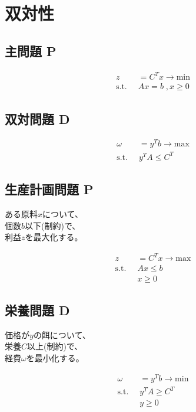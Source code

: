 \documentclass[twocolumn]{ltjsarticle}
\newcommand{\st}{
    \mathrm{s.t.}\;\;
}
\begin{document}
\section{双対性}
\begin{multicols}{2}
    \subsection{主問題 P}
    \begin{align*}
        z&=C^Tx\rightarrow\mathrm{min}\\
        \st&Ax=b\;,x\geq0
    \end{align*}
    \subsection{双対問題 D}
    \begin{align*}
        \omega&=y^Tb\rightarrow\mathrm{max}\\
        \st&y^TA\leq C^T 
    \end{align*}
\end{multicols}

\begin{multicols}{2}
    \subsection{生産計画問題 P}
    \begin{center}
        \noindent ある原料$x$について、\\
        個数$b$以下(制約)で、\\
        利益$z$を最大化する。
    \end{center}
    \begin{align*}
        z&=C^Tx\rightarrow\mathrm{max}\\
        \st &Ax\leq b\\
        & x\geq 0
    \end{align*}
    \subsection{栄養問題 D}
    \begin{center}
            \noindent 価格が$y$の餌について、\\
            栄養$C$以上(制約)で、\\
            経費$\omega$を最小化する。
    \end{center}
    \begin{align*}
        \omega &=y^Tb\rightarrow\mathrm{min}\\
        \st &y^TA\geq C^T\\
        &y\geq 0
    \end{align*}
\end{multicols}
\end{document}
